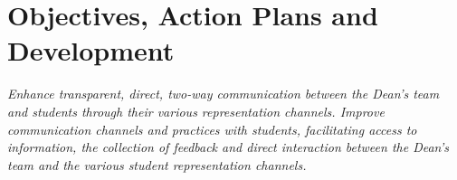 \documentclass[11pt,a4paper]{scrreprt}
\begin{document}
\newpage
{}
\section{Objectives, Action Plans and Development}
{\small\color{mutedcolor}\itshape Enhance transparent, direct, two-way communication between the Dean's team and students through their various representation channels. Improve communication channels and practices with students, facilitating access to information, the collection of feedback and direct interaction between the Dean's team and the various student representation channels. }\par\vspace{6pt}
\end{document}
